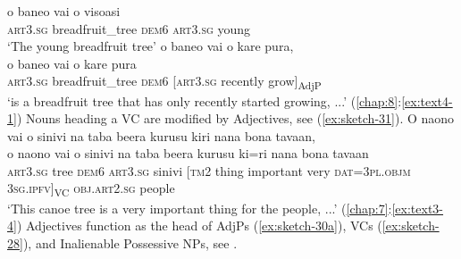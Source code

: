 \documentclass[output=paper]{langscibook}
\begin{document}
    \gll o	baneo	vai	o	visoasi\\
    \textsc{art}3.\textsc{sg}	breadfruit\_tree	\textsc{dem}6	\textsc{art}3.\textsc{sg}	young\\
    \glt `The young breadfruit tree'
\ex\label{ex:sketch-30b}
    o baneo vai o kare pura,\\
    \gll o	baneo	vai	o	kare	pura\\
    \textsc{art}3.\textsc{sg}	breadfruit\_tree	\textsc{dem}6	[\textsc{art}3.\textsc{sg}	recently	grow]\textsubscript{AdjP}\\
    \glt `is a breadfruit tree that has only recently started growing, ...' (\ref{chap:8}:\ref{ex:text4-1})
\z
\z
Nouns heading a VC are modified by Adjectives, see (\ref{ex:sketch-31}).
\ea\label{ex:sketch-31}
O naono vai o sinivi na taba beera kurusu kiri nana bona tavaan,\\
\gll o	naono	vai	o	sinivi	na	taba	beera	kurusu	ki=ri	nana	bona	tavaan\\
     \textsc{art}3.\textsc{sg}	tree	\textsc{dem}6	\textsc{art}3.\textsc{sg}	sinivi	[\textsc{tm}2	thing	important	very	\textsc{dat}=3\textsc{pl}.\textsc{objm}	3\textsc{sg}.\textsc{ipfv}]\textsubscript{VC}	\textsc{obj}.\textsc{art}2.\textsc{sg}	people\\
\glt `This canoe tree is a very important thing for the people, ...' (\ref{chap:7}:\ref{ex:text3-4})
\z
Adjectives function as the head of AdjPs (\ref{ex:sketch-30a}), VCs (\ref{ex:sketch-28}), and Inalienable Possessive NPs, see .
\end{document}
